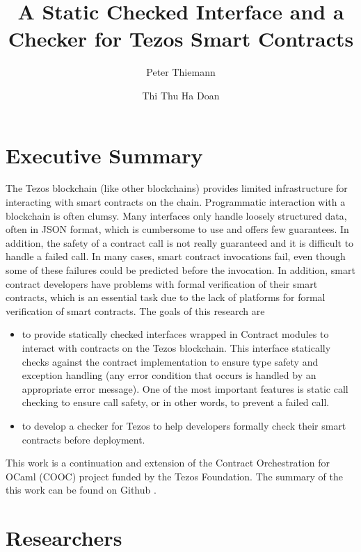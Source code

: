 \documentclass[a4paper,11pt]{article}
\title{A Static Checked Interface and a Checker for Tezos Smart Contracts
}
\author{Peter Thiemann}
\author{Thi Thu Ha Doan}
\affil{University of Freiburg, Germany}
\begin{document}
\maketitle{}

\section{Executive Summary}
\label{sec:executive-summary}
The Tezos blockchain (like other blockchains) provides limited infrastructure for interacting with smart contracts on the chain. Programmatic interaction with a blockchain is often clumsy. Many interfaces only handle loosely structured data, often in JSON format, which is cumbersome to use and offers few guarantees. In addition, the safety of a contract call is not really guaranteed and it is difficult to handle a failed call. In many cases, smart contract invocations fail, even though some of these failures could be predicted before the invocation. In addition, smart contract developers have problems with formal verification of their smart contracts, which is an essential task due to the lack of platforms for formal verification of smart contracts.
The goals of this research are 

\begin{itemize}
\item to provide statically checked interfaces wrapped in Contract modules to interact with contracts on the Tezos blockchain. This interface statically checks against the contract implementation to ensure type safety and exception handling (any error condition that occurs is handled by an appropriate error message). One of the most important features is static call checking to ensure call safety, or in other words, to prevent a failed call. 
\item to develop a checker for Tezos to help developers formally check their smart contracts before deployment.
\end{itemize}

This work is a continuation and extension of the Contract Orchestration for OCaml (COOC) project funded by the Tezos Foundation. The summary of the this work can be found on Github \cite{tezos-report}.

\section{Researchers}
\label{sec:researchers}
\end{document}
